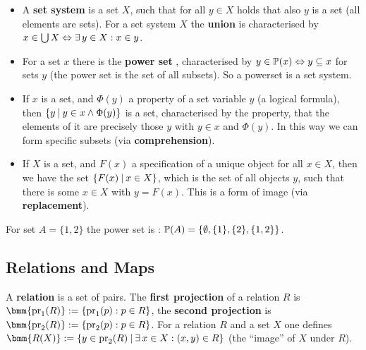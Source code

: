 \documentclass[12pt]{book}
\begin{document}
\begin{itemize}
      \item A \textbf{set system} is a set $X$, such that for all $y \in X$ holds that also $y$ is a set (all elements are sets). For a set system 
	  $X$ the \textbf{union}  is characterised by $x \in \bigcup X \Leftrightarrow \exists\, y \in X : x \in y$.
      \item For a set $x$ there is the \textbf{power set} , characterised by $y \in \operatorname{\mathbb{P}}(x) \Leftrightarrow y \subseteq x$ for sets $y$ (the power set 
	  is the set of all subsets). So a powerset is a set system.
      \item If $x$ is a set, and $\Phi(y)$ a property of a set variable $y$ (a logical formula), then $\{ y {\:|\:} y \in x \wedge \Phi(y) \}$ is a set, 
	  characterised by the property, that the elements of it are precisely those $y$ with $y \in x$ and $\Phi(y)$. In this way we can form specific 
	  subsets (via \textbf{comprehension}).
      \item If $X$ is a set, and $F(x)$ a specification of a unique object for all $x \in X$, then we have the set $\{ F(x) {\:|\:} x \in X \}$, which 
	  is the set of all objects $y$, such that there is some $x \in X$ with $y = F(x)$. This is a form of image (via \textbf{replacement}).
\end{itemize}

\begin{examp}\label{exp:infset}
      For set $A= \{1,2\}$ the power set is : $\operatorname{\mathbb{P}}(A)=\{ \emptyset,\{1\},\{2\},\{1,2\}\}$.
\end{examp}
\subsection{Relations and Maps}
\label{sec:maps}

\begin{defi}\label{def:reli}
      A \textbf{relation} is a set of pairs. The \textbf{first projection} of a relation $R$ is $\bmm{\proj_1(R)} := \set{\proj_1(p) : p \in R}$, 
	  the \textbf{second projection} is $\bmm{\proj_2(R)} := \set{\proj_2(p) : p \in R}$. For a relation $R$ and a set $X$ one defines 
	  $\bmm{R(X)}:= \set{y \in \proj_2(R) \mb \ex\, x \in X : (x,y) \in R}$ (the ``image'' of $X$ under $R$).
\end{defi}
\end{document}
